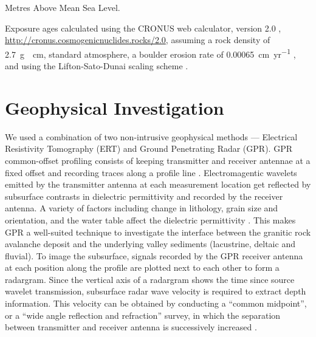 \documentclass[utf8]{frontiersSCNS}
\begin{document}
\begin{table}
\begin{threeparttable}
  \vspace{0.2cm}
  \begin{tablenotes}
  \item[1]
  Metres Above Mean Sea Level. 
  \item[2] 
  Exposure ages calculated using the CRONUS web calculator, version 2.0 \citep{phillips2016cronus, marrero2016cosmogenic}, \url{http://cronus.cosmogenicnuclides.rocks/2.0}, assuming a rock density of \SI{2.7}{g \per cm}, standard atmosphere, a boulder erosion rate of \SI{0.00065}{cm\per yr} \citep{wahrhaftig2019extent}, and using the Lifton-Sato-Dunai scaling scheme \citep{lifton2014scaling}.
  \end{tablenotes}
\end{threeparttable}
\end{table}
 
\section{Geophysical Investigation}\label{sec:geophys}

We used a combination of two non-intrusive geophysical methods --- Electrical Resistivity Tomography (ERT) and Ground Penetrating Radar (GPR). GPR common-offset profiling consists of keeping transmitter and receiver antennae at a fixed offset and recording traces along a profile line \citep{jol2008ground}. Electromagentic wavelets emitted by the transmitter antenna at each measurement location get reflected by subsurface contrasts in dielectric permittivity \citep{neal2004ground} and recorded by the receiver antenna. A variety of factors including change in lithology, grain size and orientation, and the water table affect the dielectric permittivity \citep{Olhoeft1998,neal2004ground}. This makes GPR a well-suited technique to investigate the interface between the granitic rock avalanche deposit and the underlying valley sediments (lacustrine, deltaic and fluvial). To image the subsurface, signals recorded by the GPR receiver antenna at each position along the profile are plotted next to each other to form a radargram. Since the vertical axis of a radargram shows the time since source wavelet transmission, subsurface radar wave velocity is required to extract depth information. This velocity can be obtained by conducting a ``common midpoint'', or a ``wide angle reflection and refraction'' survey, in which the separation between transmitter and receiver antenna is successively increased \citep{annan1976impulse, davis1989ground}.
\end{document}
